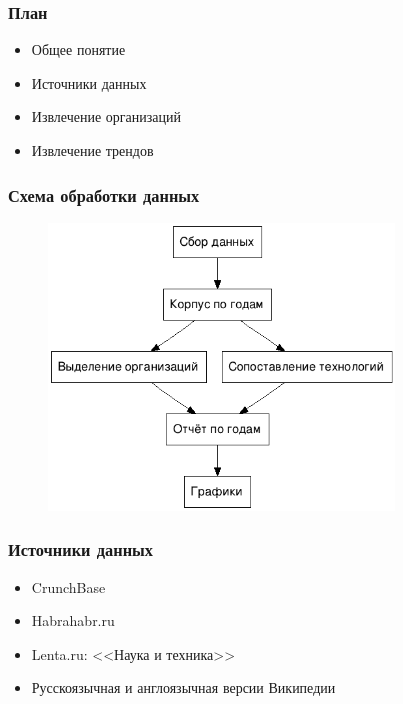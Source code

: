 \documentclass{beamer}
\begin{document}
\begin{frame}\frametitle{План}
\begin{itemize}
    \item Общее понятие
    \item Источники данных
    \item Извлечение организаций
    \item Извлечение трендов
\end{itemize}
\end{frame}

\begin{frame}\frametitle{Схема обработки данных}
\begin{figure}[ht]
\begin{center}
\includegraphics[height=3in]{pipeline.png}
\end{center}
\end{figure}
\end{frame}


\begin{frame}\frametitle{Источники данных}

\begin{itemize}
    \item CrunchBase \item Habrahabr.ru \item Lenta.ru: <<Наука и техника>> \item Русскоязычная и англоязычная версии Википедии
\end{itemize}

\end{frame}
\end{document}
